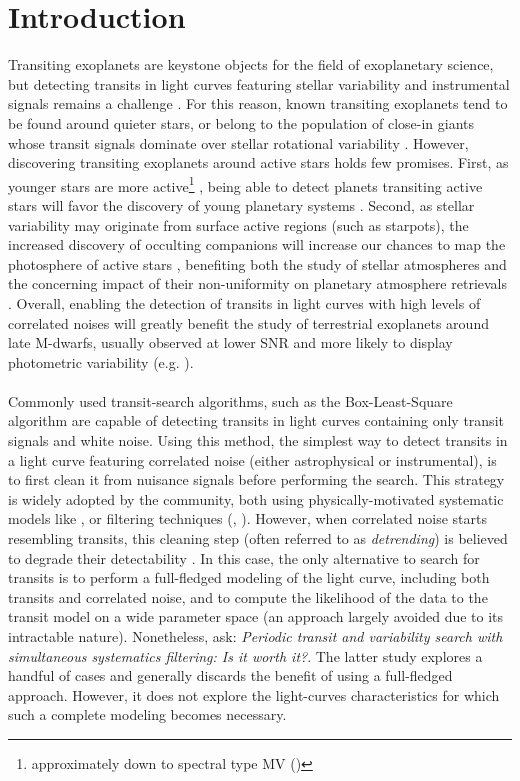\documentclass{aastex631}
\begin{document}
\section*{Introduction}
Transiting exoplanets are keystone objects for the field of exoplanetary science, but detecting transits in light curves featuring stellar variability and instrumental signals remains a challenge \citep{Pont2006,Howell2016}. For this reason, known transiting exoplanets tend to be found around quieter stars, or belong to the population of close-in giants whose transit signals dominate over stellar rotational variability \citep{Simpson2023}. However, discovering transiting exoplanets around active stars holds few promises. First, as younger stars are more active\footnote{approximately down to spectral type MV ()} \citep{Skumanich1972}, being able to detect planets transiting active stars will favor the discovery of young planetary systems \citep[e.g.][]{Newton2022}. Second, as stellar variability may originate from surface active regions (such as starpots), the increased discovery of occulting companions will increase our chances to map the photosphere of active stars \citep[e.g.][]{Morris2017}, benefiting both the study of stellar atmospheres and the concerning impact of their non-uniformity on planetary atmosphere retrievals \citep{rackham2018}. Overall, enabling the detection of transits in light curves with high levels of correlated noises will greatly benefit the study of terrestrial exoplanets around late M-dwarfs, usually observed at lower SNR and more likely to display photometric variability (e.g. \citealt{Murray2020}).
\\\\
Commonly used transit-search algorithms, such as the Box-Least-Square algorithm \citep[BLS,][]{bls} are capable of detecting transits in light curves containing only transit signals and white noise. Using this method, the simplest way to detect transits in a light curve featuring correlated noise (either astrophysical or instrumental), is to first clean it from nuisance signals before performing the search. This strategy is widely adopted by the community, both using physically-motivated systematic models like \cite{everest1, everest2}, or filtering techniques (\citealt{Jenkins2010}, \citealt{wotan}). However, when correlated noise starts resembling transits, this cleaning step (often referred to as \textit{detrending}) is believed to degrade their detectability \cite[see subsection 4.3 of][]{wotan}. In this case, the only alternative to search for transits is to perform a full-fledged modeling of the light curve, including both transits and correlated noise, and to compute the likelihood of the data to the transit model on a wide parameter space (an approach largely avoided due to its intractable nature). Nonetheless, \cite{kovacs2016} ask: \textit{Periodic transit and variability search with simultaneous systematics filtering: Is it worth it?}. The latter study explores a handful of cases and generally discards the benefit of using a full-fledged approach. However, it does not explore the light-curves characteristics for which such a complete modeling becomes necessary.
\end{document}
